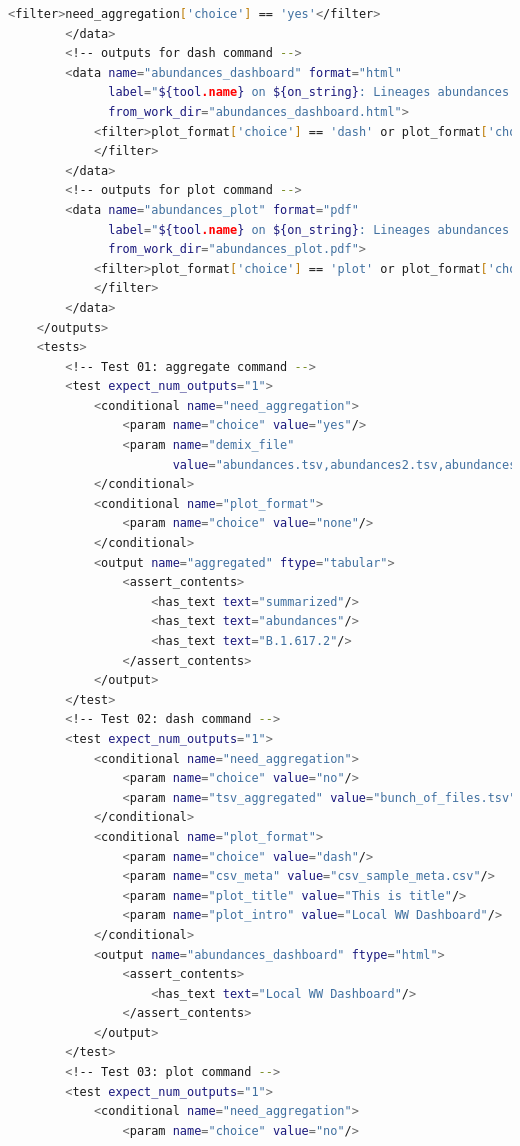 \begin{lstlisting}[language=bash, caption=tool wrapper for Freyja: Aggregate and visualize demixed results, label=list:methods:wrapper-freyja-agg]
            <filter>need_aggregation['choice'] == 'yes'</filter>
        </data>
        <!-- outputs for dash command -->
        <data name="abundances_dashboard" format="html"
              label="${tool.name} on ${on_string}: Lineages abundances dashboard"
              from_work_dir="abundances_dashboard.html">
            <filter>plot_format['choice'] == 'dash' or plot_format['choice'] == 'plot_and_dash'
            </filter>
        </data>
        <!-- outputs for plot command -->
        <data name="abundances_plot" format="pdf"
              label="${tool.name} on ${on_string}: Lineages abundances plot"
              from_work_dir="abundances_plot.pdf">
            <filter>plot_format['choice'] == 'plot' or plot_format['choice'] == 'plot_and_dash'
            </filter>
        </data>
    </outputs>
    <tests>
        <!-- Test 01: aggregate command -->
        <test expect_num_outputs="1">
            <conditional name="need_aggregation">
                <param name="choice" value="yes"/>
                <param name="demix_file"
                       value="abundances.tsv,abundances2.tsv,abundances3.tsv,abundances4.tsv"/>
            </conditional>
            <conditional name="plot_format">
                <param name="choice" value="none"/>
            </conditional>
            <output name="aggregated" ftype="tabular">
                <assert_contents>
                    <has_text text="summarized"/>
                    <has_text text="abundances"/>
                    <has_text text="B.1.617.2"/>
                </assert_contents>
            </output>
        </test>
        <!-- Test 02: dash command -->
        <test expect_num_outputs="1">
            <conditional name="need_aggregation">
                <param name="choice" value="no"/>
                <param name="tsv_aggregated" value="bunch_of_files.tsv"/>
            </conditional>
            <conditional name="plot_format">
                <param name="choice" value="dash"/>
                <param name="csv_meta" value="csv_sample_meta.csv"/>
                <param name="plot_title" value="This is title"/>
                <param name="plot_intro" value="Local WW Dashboard"/>
            </conditional>
            <output name="abundances_dashboard" ftype="html">
                <assert_contents>
                    <has_text text="Local WW Dashboard"/>
                </assert_contents>
            </output>
        </test>
        <!-- Test 03: plot command -->
        <test expect_num_outputs="1">
            <conditional name="need_aggregation">
                <param name="choice" value="no"/>

\end{lstlisting}
